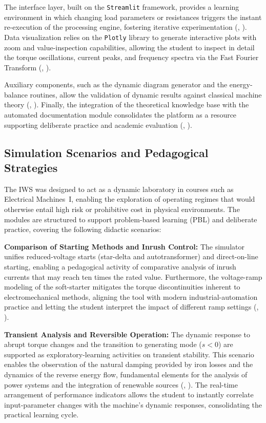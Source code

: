 \documentclass[a4paper]{ifacconf}
\begin{document}
The interface layer, built on the \texttt{Streamlit} framework, provides a learning environment in which changing load parameters or resistances triggers the instant re-execution of the processing engine, fostering iterative experimentation (\citeauthor{tuanmohamad2024advance}, \citeyear{tuanmohamad2024advance}). Data visualization relies on the \texttt{Plotly} library to generate interactive plots with zoom and value-inspection capabilities, allowing the student to inspect in detail the torque oscillations, current peaks, and frequency spectra via the Fast Fourier Transform (\citeauthor{mohapatra2019steady}, \citeyear{mohapatra2019steady}).

Auxiliary components, such as the dynamic diagram generator and the energy-balance routines, allow the validation of dynamic results against classical machine theory (\citeauthor{kumari2025comparative}, \citeyear{kumari2025comparative}). Finally, the integration of the theoretical knowledge base with the automated documentation module consolidates the platform as a resource supporting deliberate practice and academic evaluation (\citeauthor{souza2011ambiente}, \citeyear{souza2011ambiente}).

\subsection{Simulation Scenarios and Pedagogical Strategies}

The IWS was designed to act as a dynamic laboratory in courses such as Electrical Machines~I, enabling the exploration of operating regimes that would otherwise entail high risk or prohibitive cost in physical environments. The modules are structured to support problem-based learning (PBL) and deliberate practice, covering the following didactic scenarios:

\textbf{Comparison of Starting Methods and Inrush Control:} The simulator unifies reduced-voltage starts (star-delta and autotransformer) and direct-on-line starting, enabling a pedagogical activity of comparative analysis of inrush currents that may reach ten times the rated value. Furthermore, the voltage-ramp modeling of the soft-starter mitigates the torque discontinuities inherent to electromechanical methods, aligning the tool with modern industrial-automation practice and letting the student interpret the impact of different ramp settings (\citeauthor{singh2015}, \citeyear{singh2015}).

\textbf{Transient Analysis and Reversible Operation:} The dynamic response to abrupt torque changes and the transition to generating mode ($s < 0$) are supported as exploratory-learning activities on transient stability. This scenario enables the observation of the natural damping provided by iron losses and the dynamics of the reverse energy flow, fundamental elements for the analysis of power systems and the integration of renewable sources (\citeauthor{ikeda2007simulation}, \citeyear{ikeda2007simulation}). The real-time arrangement of performance indicators allows the student to instantly correlate input-parameter changes with the machine's dynamic responses, consolidating the practical learning cycle.
\end{document}
